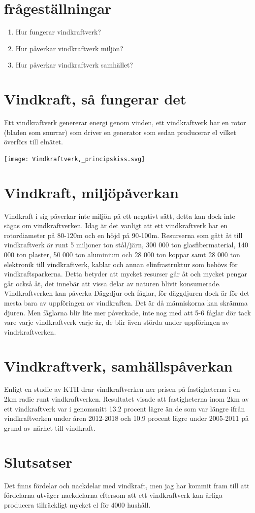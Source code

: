 \documentclass[11p]{article}
\begin{document}
    \section{frågeställningar}
    \begin{enumerate}
        \item Hur fungerar vindkraftverk?
        \item Hur påverkar vindkraftverk miljön?
        \item Hur påverkar vindkraftverk samhället?
    \end{enumerate}


    \section{Vindkraft, så fungerar det}
    Ett vindkraftverk genererar energi genom vinden,
    ett vindkraftverk har en rotor (bladen som snurrar) som driver en generator som sedan producerar el vilket överförs till elnätet. \parencite{Wikipediavindkraftverk}

    \texttt{[image: Vindkraftverk,\_principskiss.svg]}


    \section{Vindkraft, miljöpåverkan}
    Vindkraft i sig påverkar inte miljön på ett negativt sätt, detta kan dock inte sägas om vindkraftverken.
    Idag är det vanligt att ett vindkraftverk har en rotordiameter på 80-120m och en höjd på 90-100m.\parencite{vindkraftsnyheter}
    Resurserna som gått åt till vindkraftverk är runt 5 miljoner ton stål/järn, 300 000 ton glasfibermaterial, 140 000 ton plaster,
    50 000 ton aluminium och 28 000 ton koppar samt 28 000 ton elektronik till vindkraftverk, kablar och annan elinfrastruktur som behövs för vindkraftsparkerna. \parencite{energimyndigheten}
    Detta betyder att mycket resurser går åt och mycket pengar går också åt, det innebär att vissa delar av naturen blivit konsumerade.
    Vindkraftverken kan påverka Däggdjur och fåglar, för däggdjuren dock är för det mesta bara av uppföringen av vindkraften. Det är då människorna kan skrämma djuren.
    Men fåglarna blir lite mer påverkade, inte nog med att 5-6 fåglar dör tack vare varje vindkraftverk varje år, de blir även störda under uppföringen av vindrkraftverken.\parencite{naturvårdsverket}

    \section{Vindkraftverk, samhällspåverkan}
    Enligt en studie av KTH drar vindkraftverken ner prisen på fastigheterna i en 2km radie runt vindkraftverken.
    Resultatet visade att fastigheterna inom 2km av ett vindkraftverk var i genomsnitt 13.2 procent lägre än de som var längre ifrån vindkraftverken under åren 2012-2018 och
    10.9 procent lägre under 2005-2011 på grund av närhet till vindkraft.\parencite{motvindsverige}

    \section{Slutsatser}
Det finns fördelar och nackdelar med vindkraft, men jag har kommit fram till att fördelarna utväger nackdelarna eftersom att ett vindkraftverk kan årliga producera tillräckligt mycket el för 4000 hushåll.\parencite{vattenfall}



    \printbibliography
\end{document}

